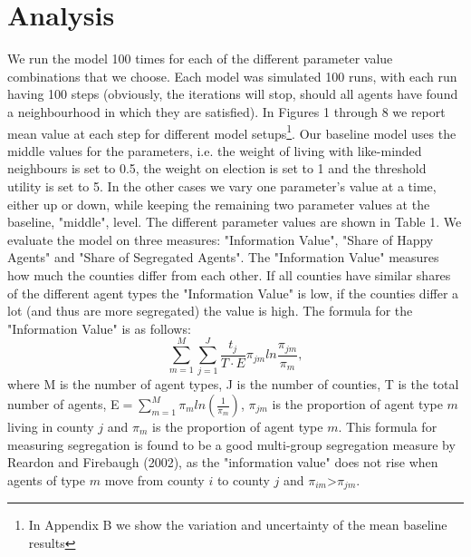 \documentclass[12pt, a4paper]{article}
\begin{document}
	
	
	
	
	
	
	\section{\label{sec_res}Analysis}
	We run the model 100 times for each of the different parameter value combinations that we choose. Each model was simulated 100 runs, with each run having 100 steps (obviously, the iterations will stop, should all agents have found a neighbourhood in which they are satisfied). In Figures 1 through 8 we report mean value at each step for different model setups\footnote{In Appendix B we show the variation and uncertainty of the mean baseline results}. Our baseline model uses the middle values for the parameters, i.e. the weight of living with like-minded neighbours is set to 0.5, the weight on election is set to 1 and the threshold utility is set to 5. In the other cases we vary one parameter's value at a time, either up or down, while keeping the remaining two parameter values at the baseline, "middle", level. The different parameter values are shown in Table 1. We evaluate the model on three measures: "Information Value", "Share of Happy Agents" and "Share of Segregated Agents". The "Information Value" measures how much the counties differ from each other. If all counties have similar shares of the different agent types the "Information Value" is low, if the counties differ a lot (and thus are more segregated) the value is high. The formula for the "Information Value" is as follows: \newline
	$$\sum_{m=1}^{M}\sum_{j=1}^{J}\frac{t_j}{T \cdot E}\pi_{jm}ln\frac{\pi_{jm}}{\pi_m},$$ where M is the number of agent types, J is the number of counties, T is the total number of agents, E$=\sum_{m=1}^{M}\pi_m ln(\frac{1}{\pi_m})$, $\pi_{jm}$ is the proportion of agent type $m$ living in county $j$ and $\pi_m$ is the proportion of agent type $m$. This formula for measuring segregation is found to be a good multi-group segregation measure by Reardon and Firebaugh (2002), as the "information value" does not rise when agents of type $m$ move from county $i$ to county $j$ and $\pi_{im}$\textgreater$\pi_{jm}$.
	
\end{document}
